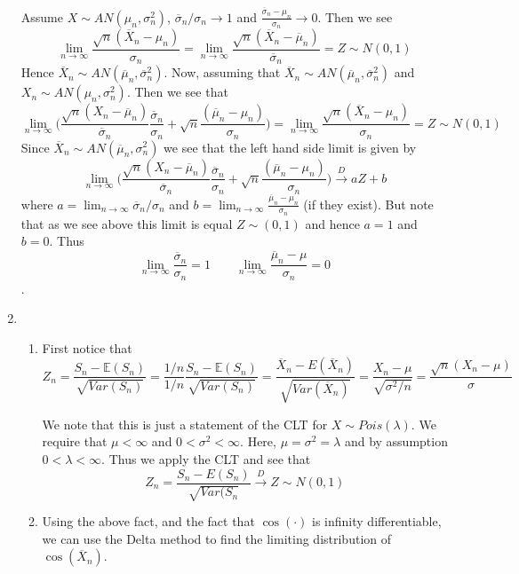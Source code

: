 \documentclass[12pt]{article}  %
\newcommand{\E}{{\mathbb{E}}}
\begin{document}
\begin{enumerate}
Assume $X\sim AN(\mu_{n}, \sigma^2_n)$, $\overline{\sigma}_n/\sigma_n\to1$ and $\frac{\overline{\sigma}_n-\mu_n}{\sigma_n}\to 0$. Then we see $$\lim_{n\to\infty}\frac{\sqrt{n}(\overline{X}_n - \mu_n)}{\sigma_n} = \lim_{n\to\infty}\frac{\sqrt{n}(\overline{X}_n - \overline{\mu}_n)}{\overline{\sigma}_n}=Z\sim N(0,1)$$ Hence $\overline{X}_n\sim AN(\overline{\mu}_n, \overline{\sigma}^2_n)$. Now, assuming that $\overline{X}_n\sim AN(\overline{\mu}_n, \overline{\sigma}^2_n)$ and $X_n\sim AN(\mu_n, \sigma_n^2)$. Then we see that 
$$\lim_{n\to\infty}\Big(\frac{\sqrt{n}(X_n - \overline{\mu}_n)}{\overline{\sigma}_n}\frac{\overline{\sigma}_n}{\sigma_n} + \sqrt{n}\frac{(\overline{\mu}_n - \mu_n)}{\sigma_n}\Big) = \lim_{n\to\infty}\frac{\sqrt{n}(\overline{X}_n - \mu_n)}{\sigma_n} = Z\sim N(0,1)$$ Since $\overline{X}_n\sim AN(\overline{\mu}_n, \sigma_n^2)$ we see that the left hand side limit is given by $$\lim_{n\to\infty}\Big(\frac{\sqrt{n}(X_n - \overline{\mu}_n)}{\overline{\sigma}_n}\frac{\overline{\sigma}_n}{\sigma_n} + \sqrt{n}\frac{(\overline{\mu}_n - \mu_n)}{\sigma_n}\Big)\overset{D}{\longrightarrow}aZ + b$$ where $a = \lim_{n\to\infty}\overline{\sigma}_n/\sigma_n$ and $b = \lim_{n\to\infty}\frac{\overline{\mu}_n - \mu_n}{\sigma_n}$ (if they exist). But note that as we see above this limit is equal $Z\sim(0,1)$ and hence $a = 1$ and $b = 0$. Thus $$\lim_{n\to \infty}\frac{\overline{\sigma}_n}{\sigma_n} = 1 \hspace{2em} \lim_{n\to\infty}\frac{\overline{\mu}_n - \mu}{\sigma_n} = 0$$. 

\item 
\begin{enumerate}
\item First notice that 
$$Z_n = \frac{S_n - \E(S_n)}{\sqrt{Var(S_n)}} = \frac{1/n}{1/n}\frac{S_n - \E(S_n)}{\sqrt{Var(S_n)}} = \frac{\overline{X}_n - E(\overline{X}_n)}{\sqrt{Var(\overline{X}_n)}} = \frac{X_n - \mu}{\sqrt{\sigma^2/n}} =\frac{\sqrt{n}(X_n - \mu)}{\sigma}$$

We note that this is just a statement of the CLT for $X\sim Pois(\lambda)$. We require that $\mu<\infty$ and $0<\sigma^2<\infty$. Here, $\mu = \sigma^2 = \lambda$ and by assumption $0<\lambda<\infty$. Thus we apply the CLT and see that $$Z_n = \frac{S_n - E(S_n)}{\sqrt{Var(S_n}}\overset{D}{\longrightarrow}Z\sim N(0,1)$$  

\item Using the above fact, and the fact that $\cos(\cdot)$ is infinity differentiable, we can use the Delta method to find the limiting distribution of $\cos(\overline{X}_n)$. 


\end{enumerate}
\end{enumerate}
\end{document}
